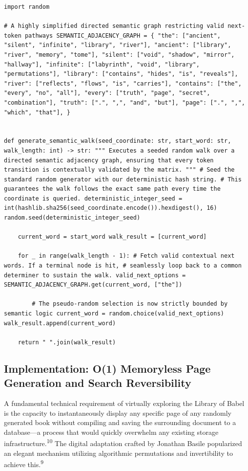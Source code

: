 \documentclass[
  11pt,
  a4paper,
]{article}
\begin{document}
\begin{lstlisting}[style=babelpython]
import random

# A highly simplified directed semantic graph restricting valid next-token pathways SEMANTIC_ADJACENCY_GRAPH = { "the": ["ancient", "silent", "infinite", "library", "river"], "ancient": ["library", "river", "memory", "tome"], "silent": ["void", "shadow", "mirror", "hallway"], "infinite": ["labyrinth", "void", "library", "permutations"], "library": ["contains", "hides", "is", "reveals"], "river": ["reflects", "flows", "is", "carries"], "contains": ["the", "every", "no", "all"], "every": ["truth", "page", "secret", "combination"], "truth": [".", ",", "and", "but"], "page": [".", ",", "which", "that"], }


def generate_semantic_walk(seed_coordinate: str, start_word: str, walk_length: int) -> str: """ Executes a seeded random walk over a directed semantic adjacency graph, ensuring that every token transition is contextually validated by the matrix. """ # Seed the standard random generator with our deterministic hash string. # This guarantees the walk follows the exact same path every time the coordinate is queried. deterministic_integer_seed = int(hashlib.sha256(seed_coordinate.encode()).hexdigest(), 16) random.seed(deterministic_integer_seed)

    current_word = start_word walk_result = [current_word]

    for _ in range(walk_length - 1): # Fetch valid contextual next words. If a terminal node is hit, # seamlessly loop back to a common determiner to sustain the walk. valid_next_options = SEMANTIC_ADJACENCY_GRAPH.get(current_word, ["the"])

        # The pseudo-random selection is now strictly bounded by semantic logic current_word = random.choice(valid_next_options) walk_result.append(current_word)

    return " ".join(walk_result) \end{lstlisting}

\subsection{Implementation: O(1) Memoryless Page Generation and Search Reversibility}\label{implementation-o1-memoryless-page-generation-and-search-reversibility}

A fundamental technical requirement of virtually exploring the Library of Babel is the capacity to instantaneously display any specific page of any randomly generated book without compiling and saving the surrounding document to a database---a process that would quickly overwhelm any existing storage infrastructure.\textsuperscript{10} The digital adaptation crafted by Jonathan Basile popularized an elegant mechanism utilizing algorithmic permutations and invertibility to achieve this.\textsuperscript{9}
\end{document}
